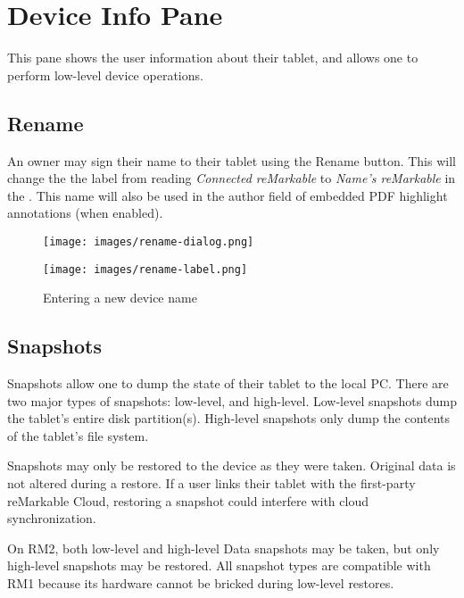 \newpage
\section{Device Info Pane}
\label{sec:deviceinfo}
This pane shows the user information about their tablet, and allows one to perform low-level device operations.

\subsection{Rename}
An owner may sign their name to their tablet using the Rename button. This will change the the label from reading \textit{Connected reMarkable} to \textit{Name's reMarkable} in the . This name will also be used in the author field of embedded PDF highlight annotations (when enabled).


\begin{figure}[h]
\centering
\begin{minipage}{.5\textwidth}
  \centering
  \texttt{[image: images/rename-dialog.png]}
\end{minipage}%
\begin{minipage}{.5\textwidth}
  \centering
  \texttt{[image: images/rename-label.png]}
\end{minipage}
\caption{Entering a new device name}
\end{figure}


\subsection{Snapshots}
Snapshots allow one to dump the state of their tablet to the local PC. There are two major types of snapshots: low-level, and high-level. Low-level snapshots dump the tablet's entire disk partition(s). High-level snapshots only dump the contents of the tablet's file system.

Snapshots may only be restored to the device as they were taken. Original data is not altered during a restore. If a user links their tablet with the first-party reMarkable Cloud, restoring a snapshot could interfere with cloud synchronization.

On RM2, both low-level and high-level Data snapshots may be taken, but only high-level snapshots may be restored. All snapshot types are compatible with RM1 because its hardware cannot be bricked during low-level restores.

